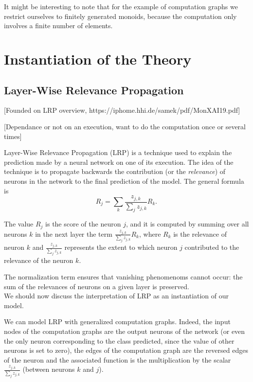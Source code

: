 \documentclass[11pt,a4paper]{article}
\theoremstyle{definition}
\begin{document}
It might be interesting to note that for the example of computation graphs we restrict ourselves to finitely generated monoids, because the computation only involves a finite number of elements.

\section{Instantiation of the Theory}

	\subsection{Layer-Wise Relevance Propagation}
	
		[Founded on LRP overview, https://iphome.hhi.de/samek/pdf/MonXAI19.pdf]
		
		[Dependance or not on an execution, want to do the computation once or several times]
		
	Layer-Wise Relevance Propagation (LRP) is a technique used to explain the prediction made by a neural network on one of its execution. The idea of the technique is to propagate backwards the contribution (or the \textit{relevance}) of neurons in the network to the final prediction of the model. The general formula is 
		$$ R_j = \underset{k}{\sum} \frac{z_{j,k}}{\sum_j z_{j,k}} R_k .$$
		
	The value $R_j$ is the score of the neuron $j$, and it is computed by summing over all neurons $k$ in the next layer the term $\frac{z_{j,k}}{\sum_j z_{j,k}} R_k$, where $R_k$ is the relevance of neuron $k$ and $\frac{z_{j,k}}{\sum_j z_{j,k}}$ represents the extent to which neuron $j$ contributed to the relevance of the neuron $k$.
		
	The normalization term ensures that vanishing phenomenoms cannot occur: the sum of the relevances of neurons on a given layer is preserved.
		\\
		
	We should now discuss the interpretation of LRP as an instantiation of our model.
		
	We can model LRP with generalized computation graphs. Indeed, the input nodes of the computation graphs are the output neurons of the network (or even the only neuron corresponding to the class predicted, since the value of other neurons is set to zero), the edges of the computation graph are the reversed edges of the neuron and the associated function is the multiplication by the scalar $\frac{z_{j,k}}{\sum_j z_{j,k}}$ (between neurons $k$ and $j$).
	
\end{document}
